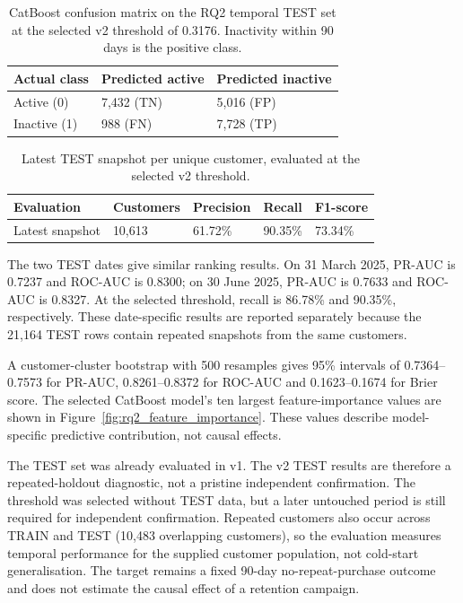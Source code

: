 \begin{table}[H]
\centering
\small
\caption{CatBoost confusion matrix on the RQ2 temporal TEST set at the selected v2 threshold of 0.3176. Inactivity within 90 days is the positive class.}
\label{tab:rq2_confusion_matrix}
\begin{tabularx}{0.82\textwidth}{|Y|C{0.25\textwidth}|C{0.25\textwidth}|}
\hline
\textbf{Actual class} & \textbf{Predicted active} & \textbf{Predicted inactive} \\
\hline
Active (0) & 7,432 (TN) & 5,016 (FP) \\
\hline
Inactive (1) & 988 (FN) & 7,728 (TP) \\
\hline
\end{tabularx}
\end{table}

\begin{table}[H]
\centering
\small
\caption{Latest TEST snapshot per unique customer, evaluated at the selected v2 threshold.}
\label{tab:rq2_latest_customer_metrics}
\begin{tabularx}{0.92\textwidth}{|Y|C{0.13\textwidth}|C{0.15\textwidth}|C{0.15\textwidth}|C{0.15\textwidth}|}
\hline
\textbf{Evaluation} & \textbf{Customers} & \textbf{Precision} & \textbf{Recall} & \textbf{F1-score} \\
\hline
Latest snapshot & 10,613 & 61.72\% & 90.35\% & 73.34\% \\
\hline
\end{tabularx}
\end{table}

The two TEST dates give similar ranking results. On 31 March 2025,
PR-AUC is 0.7237 and ROC-AUC is 0.8300; on 30 June 2025, PR-AUC is
0.7633 and ROC-AUC is 0.8327. At the selected threshold, recall is
86.78\% and 90.35\%, respectively. These date-specific results are
reported separately because the 21,164 TEST rows contain repeated
snapshots from the same customers.

A customer-cluster bootstrap with 500 resamples gives 95\% intervals of
0.7364--0.7573 for PR-AUC, 0.8261--0.8372 for ROC-AUC and
0.1623--0.1674 for Brier score. The selected CatBoost model's ten largest
feature-importance values are shown in Figure~\ref{fig:rq2_feature_importance}.
These values describe model-specific predictive contribution, not causal
effects.

The TEST set was already evaluated in v1. The v2 TEST results are therefore
a repeated-holdout diagnostic, not a pristine independent confirmation.
The threshold was selected without TEST data, but a later untouched period
is still required for independent confirmation. Repeated customers also
occur across TRAIN and TEST (10,483 overlapping customers), so the
evaluation measures temporal performance for the supplied customer
population, not cold-start generalisation. The target remains a fixed
90-day no-repeat-purchase outcome and does not estimate the causal effect
of a retention campaign.

